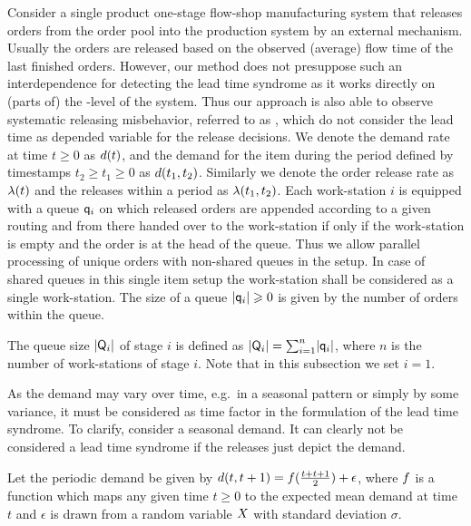 \documentclass[mnsc]{informs3}
\begin{document}
Consider a single product one-stage flow-shop manufacturing system that releases orders from the
order pool into the production system by an external mechanism.
%
Usually the orders are released based on the observed (average) flow time of the last finished
orders. However, our method does not presuppose such an interdependence for detecting the lead time
syndrome as it works directly on (parts of) the \WIP{}-level of the system. Thus our approach is
also able to observe systematic releasing misbehavior, referred to as \LTS{}, which do not consider
the lead time as depended variable for the release decisions.
%
%
We denote the demand rate at time $t \geqslant 0$ as ${d}(t)$, and the demand for the item during
the period defined by timestamps $t_{2} \geqslant t_{1} \geqslant 0$ as ${d}(t_{1},t_{2})$.
Similarly we denote the order release rate as ${\lambda}(t)$ and the releases within a period as
${\lambda}(t_{1},t_{2})$. Each work-station $i$ is equipped with a queue $\mathsf{q}_{i}$ on which released
orders are appended according to a given routing and from there handed over to the work-station if
only if the work-station is empty and the order is at the head of the queue. Thus we allow parallel
processing of unique orders with non-shared queues in the setup. In case of shared queues in this
single item setup the work-station shall be considered as a single work-station. The size of a queue
$\lvert{\mathsf{q}_{i}}\rvert \geqslant 0$ is given by the number of orders within the queue.


\begin{definition}

  The queue size $\lvert{\mathsf{Q}_{i}}\rvert$ of stage $i$ is defined as
  $\lvert{\mathsf{Q}_{i}}\rvert = \sum_{i=1}^{n} \lvert{\mathsf{q}_{i}}\rvert$, where $n$ is the number of work-stations of stage
  $i$. Note that in this subsection we set $i=1$.

\end{definition}


As the demand may vary over time, e.g.~in a seasonal pattern or simply by some variance, it must be
considered as time factor in the formulation of the lead time syndrome. To clarify, consider a
seasonal demand. It can clearly not be considered a lead time syndrome if the releases just depict
the demand.

Let the periodic demand be given by ${d}(t,t+1) = {f}(\frac{t+t+1}{2}) + \epsilon$,
where ${f}$ is a function which maps any given time $t \geqslant 0$ to the expected mean demand
at time $t$ and $\epsilon$ is drawn from a random variable $X$ with standard deviation $\sigma$.
\end{document}
